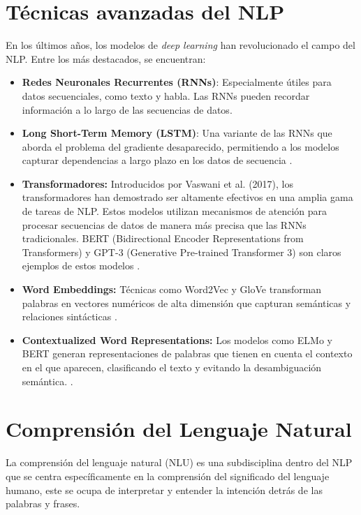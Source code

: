 \section{Técnicas avanzadas del NLP}\label{tecnicas-avanzadas}
En los últimos años, los modelos de \textit{deep learning} han revolucionado el campo del NLP. Entre los más destacados, se encuentran:

\begin{itemize}
\item \textbf{Redes Neuronales Recurrentes (RNNs)}: Especialmente útiles para datos secuenciales, como texto y habla. Las RNNs pueden recordar información a lo largo de las secuencias de datos\citep{hochreiter1997long}.
\item \textbf{Long Short-Term Memory (LSTM)}: Una variante de las RNNs que aborda el problema del gradiente desaparecido, permitiendo a los modelos capturar dependencias a largo plazo en los datos de secuencia \citep{hochreiter1997long}.
\item \textbf{Transformadores:} Introducidos por Vaswani et al. (2017), los transformadores han demostrado ser altamente efectivos en una amplia gama de tareas de NLP. Estos modelos utilizan mecanismos de atención para procesar secuencias de datos de manera más precisa que las RNNs tradicionales. BERT (Bidirectional Encoder Representations from Transformers) y GPT-3 (Generative Pre-trained Transformer 3) son claros ejemplos de estos modelos \citep{vaswani2017attention, devlin2019bert}.

\item \textbf{Word Embeddings:} Técnicas como Word2Vec y GloVe transforman palabras en vectores numéricos de alta dimensión que capturan semánticas y relaciones sintácticas \citep{mikolov2013efficient, pennington2014glove}.
\item \textbf{Contextualized Word Representations:} Los modelos como ELMo y BERT generan representaciones de palabras que tienen en cuenta el contexto en el que aparecen, clasificando el texto y evitando la desambiguación semántica. \citep{peters2018deep, devlin2019bert}.

\end{itemize}

\section{Comprensión del Lenguaje Natural}\label{NLU}
La comprensión del lenguaje natural (NLU) es una subdisciplina dentro del NLP que se centra específicamente en la comprensión del significado del lenguaje humano, este se ocupa de interpretar y entender la intención detrás de las palabras y frases.

